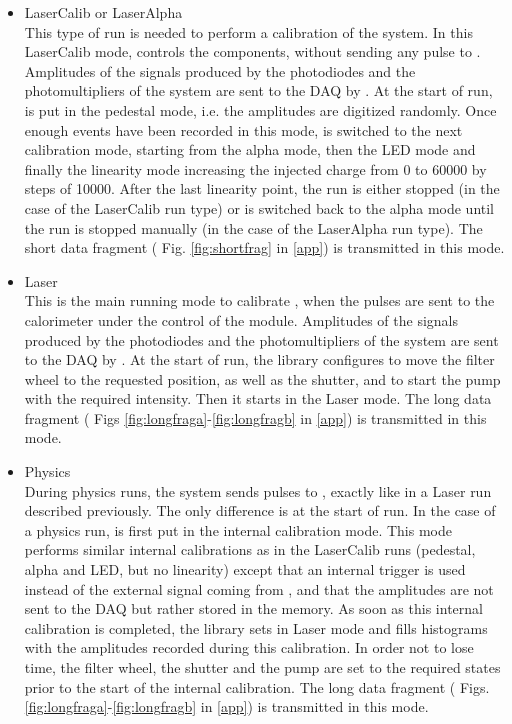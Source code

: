 \begin{itemize}
\item{LaserCalib or LaserAlpha}~\\
This type of run is needed to perform a calibration of the \lasii{} system. In this
LaserCalib mode, \lascar{} controls the \lasii{} components, without sending any
\las{} pulse to \tilecal{}. Amplitudes of the signals produced by the photodiodes
and the photomultipliers of the \lasii{} system are sent to the \atlas{} DAQ by \lascar{}.
At the start of run, \lascar{} is put in the pedestal mode, i.e. the amplitudes
are digitized randomly. Once enough events have been recorded in this mode,
\lascar{} is switched to the next calibration mode, starting from the alpha mode, then the
LED mode and finally the linearity mode increasing the injected charge from 0 to 60000 by steps
of 10000. After the last linearity point, the run is either stopped (in the case of the
LaserCalib run type) or \lascar{} is switched back to the alpha mode until the run is stopped
manually (in the case of the LaserAlpha run type). The short data fragment ( Fig. \ref{fig:shortfrag} in \ref{app}) is transmitted in this mode.


\item{Laser}~\\
This is the main running mode to calibrate \tilecal{}, when the \las{} pulses are sent to the
calorimeter under the control of the \shaft{} module. Amplitudes of the signals produced by the 
photodiodes and the photomultipliers of the \lasii{} system are sent to the \atlas{} DAQ by 
\lascar{}. At the start of run, the \lasmodule{} library configures \lascar{} to move the filter
wheel to the requested position, as well as the shutter, and to start the \las{} pump with the 
required intensity. Then it starts \lascar{} in the Laser mode. The long data fragment ( Figs \ref{fig:longfraga}-\ref{fig:longfragb} in \ref{app}) is transmitted in this mode.

\item{Physics}~\\
During physics runs, the \lasii{} system sends \las{} pulses to \tilecal{}, exactly like in
a Laser run described previously. The only difference is at the start of run. In the case of
a physics run, \lascar{} is first put in the internal calibration mode. This mode performs
similar internal calibrations as in the LaserCalib runs (pedestal, alpha and LED, but no
linearity) except that an internal trigger is used instead of the external signal coming from
\shaft{}, and that the amplitudes are not sent to the \atlas{} DAQ but rather stored in the 
\lascar{} memory. As soon as this internal calibration is completed, the \lasmodule{} library
sets \lascar{} in Laser mode and fills histograms with the amplitudes recorded during this
calibration. In order not to lose time, the filter wheel, the shutter and the \las{} pump
are set to the required states prior to the start of the internal calibration. The long data fragment ( Figs. \ref{fig:longfraga}-\ref{fig:longfragb} in \ref{app}) is transmitted in this mode.


\end{itemize}
